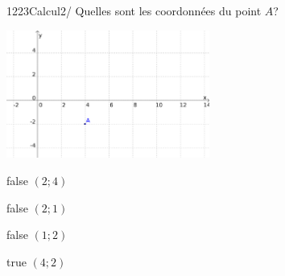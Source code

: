             \begin{question}{1223}{Calcul}{2}{/}
                Quelles sont les coordonnées du point $A$?\\
                \begin{center}
                	\includegraphics[width=0.5\textwidth]{Philippe/Figures_Philippe/calcul_6_5.png}
                \end{center}
            \end{question}
            \begin{reponses}
                \item[false] $(2;4)$
                \item[false] $(2;1)$
                \item[false] $(1;2)$
                \item[true] $(4;2)$
            \end{reponses}

